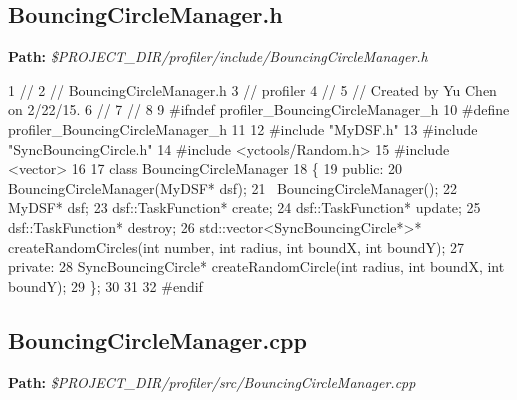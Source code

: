 \hypertarget{_benchmark_program_BenchmarkProgramBouncingCircleManager_h}{}\subsection{Bouncing\+Circle\+Manager.\+h}\label{_benchmark_program_BenchmarkProgramBouncingCircleManager_h}
{\bfseries Path\+:} {\itshape \$\+P\+R\+O\+J\+E\+C\+T\+\_\+\+D\+I\+R/profiler/include/\+Bouncing\+Circle\+Manager.h} 
\begin{DoxyCodeInclude}
1 \textcolor{comment}{//}
2 \textcolor{comment}{//  BouncingCircleManager.h}
3 \textcolor{comment}{//  profiler}
4 \textcolor{comment}{//}
5 \textcolor{comment}{//  Created by Yu Chen on 2/22/15.}
6 \textcolor{comment}{//}
7 \textcolor{comment}{//}
8 
9 \textcolor{preprocessor}{#ifndef profiler\_BouncingCircleManager\_h}
10 \textcolor{preprocessor}{#define profiler\_BouncingCircleManager\_h}
11 
12 \textcolor{preprocessor}{#include "MyDSF.h"}
13 \textcolor{preprocessor}{#include "SyncBouncingCircle.h"}
14 \textcolor{preprocessor}{#include <yctools/Random.h>}
15 \textcolor{preprocessor}{#include <vector>}
16 
17 \textcolor{keyword}{class }BouncingCircleManager
18 \{
19 \textcolor{keyword}{public}:
20     BouncingCircleManager(MyDSF* dsf);
21     ~BouncingCircleManager();
22     MyDSF* dsf;
23     dsf::TaskFunction* create;
24     dsf::TaskFunction* update;
25     dsf::TaskFunction* destroy;
26     std::vector<SyncBouncingCircle*>* createRandomCircles(\textcolor{keywordtype}{int} number, \textcolor{keywordtype}{int} radius, \textcolor{keywordtype}{int} boundX, \textcolor{keywordtype}{int} boundY);
27 \textcolor{keyword}{private}:
28     SyncBouncingCircle* createRandomCircle(\textcolor{keywordtype}{int} radius, \textcolor{keywordtype}{int} boundX, \textcolor{keywordtype}{int} boundY);
29 \};
30 
31 
32 \textcolor{preprocessor}{#endif}
\end{DoxyCodeInclude}
 \hypertarget{_benchmark_program_BenchmarkProgramBouncingCircleManager_cpp}{}\subsection{Bouncing\+Circle\+Manager.\+cpp}\label{_benchmark_program_BenchmarkProgramBouncingCircleManager_cpp}
{\bfseries Path\+:} {\itshape \$\+P\+R\+O\+J\+E\+C\+T\+\_\+\+D\+I\+R/profiler/src/\+Bouncing\+Circle\+Manager.cpp} 
